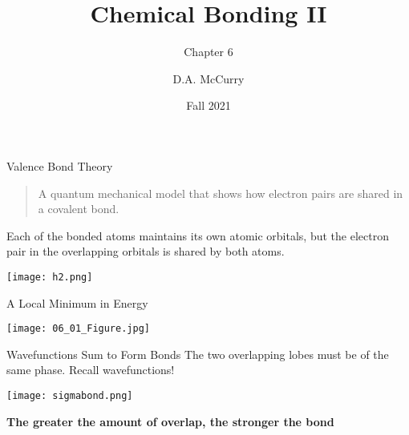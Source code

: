 \documentclass[handout]{beamer}
\title{Chemical Bonding II}
\subtitle{Chapter 6}
\institute{CHEM115 --- Chemistry for the Sciences I \\ Bloomsburg University}
\author{D.A. McCurry}
\date{Fall 2021}
\begin{document}
\maketitle
{}


\begin{frame}[c]{Valence Bond Theory}
	\begin{quote}
		A quantum mechanical model that shows how electron pairs are
		shared in a covalent bond.
	\end{quote}

	\bigskip
	Each of the bonded atoms maintains its own atomic orbitals, but the
	electron pair in the \alert{overlapping} orbitals is shared by both atoms.
		
	\begin{center}
		\texttt{[image: h2.png]}
	\end{center}
\end{frame}

\begin{frame}{A Local Minimum in Energy}
	\begin{center}
		\texttt{[image: 06\_01\_Figure.jpg]}
	\end{center}
\end{frame}
	
\begin{frame}{Wavefunctions Sum to Form Bonds}
	The two overlapping lobes must be of the \alert{same phase}.  Recall
	\alert{wavefunctions}!
	\begin{center}
		\texttt{[image: sigmabond.png]}
	\end{center}

	\begin{center}
		\bfseries
		The greater the amount of overlap, the stronger the bond
	\end{center}
\end{frame}
\end{document}
